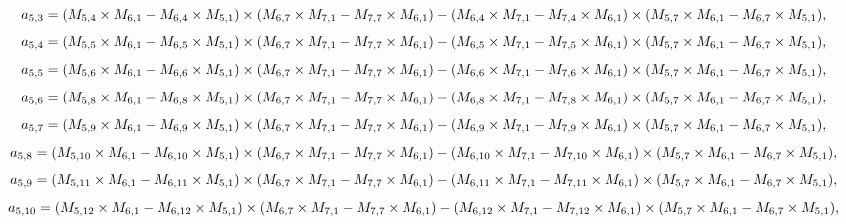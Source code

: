 \documentclass[10pt]{asme2ej}
\begin{document}
\begin{landscape}
\begin{equation}
    a_{5,3} = (M_{5,4}\times M_{6,1}-M_{6,4}\times M_{5,1})\times (M_{6,7}\times M_{7,1}-M_{7,7}\times M_{6,1})\\-(M_{6,4}\times M_{7,1}-M_{7,4}\times M_{6,1})\times (M_{5,7}\times M_{6,1}-M_{6,7}\times M_{5,1}),
\end{equation}
\begin{equation}
    a_{5,4} = (M_{5,5}\times M_{6,1}-M_{6,5}\times M_{5,1})\times (M_{6,7}\times M_{7,1}-M_{7,7}\times M_{6,1})\\-(M_{6,5}\times M_{7,1}-M_{7,5}\times M_{6,1})\times (M_{5,7}\times M_{6,1}-M_{6,7}\times M_{5,1}),
\end{equation}
\begin{equation}
    a_{5,5} = (M_{5,6}\times M_{6,1}-M_{6,6}\times M_{5,1})\times (M_{6,7}\times M_{7,1}-M_{7,7}\times M_{6,1})\\-(M_{6,6}\times M_{7,1}-M_{7,6}\times M_{6,1})\times (M_{5,7}\times M_{6,1}-M_{6,7}\times M_{5,1}),
\end{equation}
\begin{equation}
    a_{5,6} = (M_{5,8}\times M_{6,1}-M_{6,8}\times M_{5,1})\times (M_{6,7}\times M_{7,1}-M_{7,7}\times M_{6,1})\\-(M_{6,8}\times M_{7,1}-M_{7,8}\times M_{6,1})\times (M_{5,7}\times M_{6,1}-M_{6,7}\times M_{5,1}),
\end{equation}
\begin{equation}
    a_{5,7} = (M_{5,9}\times M_{6,1}-M_{6,9}\times M_{5,1})\times (M_{6,7}\times M_{7,1}-M_{7,7}\times M_{6,1})\\-(M_{6,9}\times M_{7,1}-M_{7,9}\times M_{6,1})\times (M_{5,7}\times M_{6,1}-M_{6,7}\times M_{5,1}),
\end{equation}
\begin{equation}
    a_{5,8} = (M_{5,10}\times M_{6,1}-M_{6,10}\times M_{5,1})\times (M_{6,7}\times M_{7,1}-M_{7,7}\times M_{6,1})\\-(M_{6,10}\times M_{7,1}-M_{7,10}\times M_{6,1})\times (M_{5,7}\times M_{6,1}-M_{6,7}\times M_{5,1}),
\end{equation}
\begin{equation}
    a_{5,9} = (M_{5,11}\times M_{6,1}-M_{6,11}\times M_{5,1})\times (M_{6,7}\times M_{7,1}-M_{7,7}\times M_{6,1})\\-(M_{6,11}\times M_{7,1}-M_{7,11}\times M_{6,1})\times (M_{5,7}\times M_{6,1}-M_{6,7}\times M_{5,1}),
\end{equation}
\begin{equation}
    a_{5,10} = (M_{5,12}\times M_{6,1}-M_{6,12}\times M_{5,1})\times (M_{6,7}\times M_{7,1}-M_{7,7}\times M_{6,1})\\-(M_{6,12}\times M_{7,1}-M_{7,12}\times M_{6,1})\times (M_{5,7}\times M_{6,1}-M_{6,7}\times M_{5,1}),

\end{equation}
\end{landscape}
\end{document}
